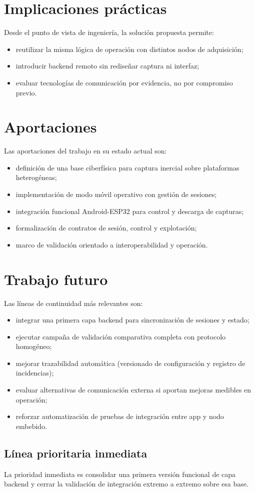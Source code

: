 \section{Implicaciones prácticas}

Desde el punto de vista de ingeniería, la solución propuesta permite:

\begin{itemize}
  \item reutilizar la misma lógica de operación con distintos nodos de adquisición;
  \item introducir backend remoto sin rediseñar captura ni interfaz;
  \item evaluar tecnologías de comunicación por evidencia, no por compromiso previo.
\end{itemize}

\section{Aportaciones}

Las aportaciones del trabajo en su estado actual son:

\begin{itemize}
  \item definición de una base ciberfísica para captura inercial sobre plataformas heterogéneas;
  \item implementación de modo móvil operativo con gestión de sesiones;
  \item integración funcional Android-ESP32 para control y descarga de capturas;
  \item formalización de contratos de sesión, control y explotación;
  \item marco de validación orientado a interoperabilidad y operación.
\end{itemize}

\section{Trabajo futuro}

Las líneas de continuidad más relevantes son:

\begin{itemize}
  \item integrar una primera capa backend para sincronización de sesiones y estado;
  \item ejecutar campaña de validación comparativa completa con protocolo homogéneo;
  \item mejorar trazabilidad automática (versionado de configuración y registro de incidencias);
  \item evaluar alternativas de comunicación externa si aportan mejoras medibles en operación;
  \item reforzar automatización de pruebas de integración entre app y nodo embebido.
\end{itemize}

\subsection{Línea prioritaria inmediata}

La prioridad inmediata es consolidar una primera versión funcional de capa backend y cerrar la validación de integración extremo a extremo sobre esa base.

